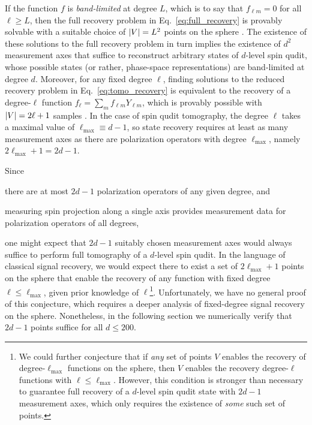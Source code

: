 \documentclass[a4paper,twocolumn,unpublished]{quantumarticle}
\renewcommand{\t}{\text} %
\begin{document}
If the function $f$ is {\it band-limited} at degree $L$, which is to say that $f_{\ell m}=0$ for all $\ell\ge L$, then the full recovery problem in Eq.~\eqref{eq:full_recovery} is provably solvable with a suitable choice of $\abs{V}=L^2$ points on the sphere \cite{freeden2008spherical, freeden2018spherical}.
The existence of these solutions to the full recovery problem in turn implies the existence of $d^2$ measurement axes that suffice to reconstruct arbitrary states of $d$-level spin qudit, whose possible states (or rather, phase-space representations) are band-limited at degree $d$.
Moreover, for any fixed degree $\ell$, finding solutions to the reduced recovery problem in Eq.~\eqref{eq:tomo_recovery} is equivalent to the recovery of a degree-$\ell$ function $f_\ell = \sum_m f_{\ell m} Y_{\ell m}$, which is provably possible with $\abs{V}=2\ell+1$ samples \cite{freeden2008spherical}.
In the case of spin qudit tomography, the degree $\ell$ takes a maximal value of $\ell_{\t{max}}\equiv d-1$, so state recovery requires at least as many measurement axes as there are polarization operators with degree $\ell_{\t{max}}$, namely $2\ell_{\t{max}}+1=2d-1$.

Since
\begin{enumerate*}
\item there are at most $2d-1$ polarization operators of any given degree, and
\item measuring spin projection along a single axis provides measurement data for polarization operators of all degrees,
\end{enumerate*}
one might expect that $2d-1$ suitably chosen measurement axes would always suffice to perform full tomography of a $d$-level spin qudit.
In the language of classical signal recovery, we would expect there to exist a set of $2\ell_{\t{max}}+1$ points on the sphere that enable the recovery of any function with fixed degree $\ell\le\ell_{\t{max}}$, given prior knowledge of $\ell$\footnote{We could further conjecture that if {\it any} set of points $V$ enables the recovery of degree-$\ell_{\t{max}}$ functions on the sphere, then $V$ enables the recovery degree-$\ell$ functions with $\ell\le\ell_{\t{max}}$.
  However, this condition is stronger than necessary to guarantee full recovery of a $d$-level spin qudit state with $2d-1$ measurement axes, which only requires the existence of {\it some} such set of points.}.
Unfortunately, we have no general proof of this conjecture, which requires a deeper analysis of fixed-degree signal recovery on the sphere.
Nonetheless, in the following section we numerically verify that $2d-1$ points suffice for all $d\le200$.
\end{document}
